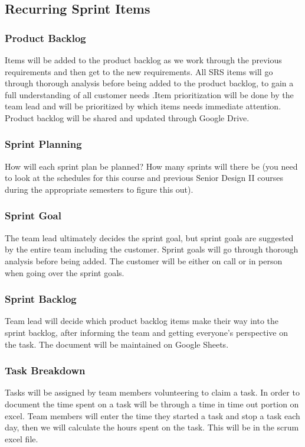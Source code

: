 \subsection{Recurring Sprint Items}
\subsubsection{Product Backlog}
Items will be added to the product backlog as we work through the previous requirements and then get to the new requirements. All SRS items will go through thorough analysis before being added to the product backlog, to gain a full understanding of all customer needs .Item prioritization will be done by the team lead and will be prioritized by which items needs immediate attention. Product backlog will be shared and updated through Google Drive.

\subsubsection{Sprint Planning}
How will each sprint plan be planned? How many sprints will there be (you need to look at the schedules for this course and previous Senior Design II courses during the appropriate semesters to figure this out).

\subsubsection{Sprint Goal}
The team lead ultimately decides the sprint goal, but sprint goals are suggested by the entire team including the customer. Sprint goals will go through thorough analysis before being added. The customer will be either on call or in person when going over the sprint goals.

\subsubsection{Sprint Backlog}
Team lead will decide which product backlog items make their way into the sprint backlog, after informing the team and getting everyone's perspective on the task. The document will be maintained on Google Sheets. 

\subsubsection{Task Breakdown}
Tasks will be assigned by team members volunteering to claim a task. In order to document the time spent on a task will be through a time in time out portion on excel. Team members will enter the time they started a task and stop a task each day, then we will calculate the hours spent on the task. This will be in the scrum excel file.

